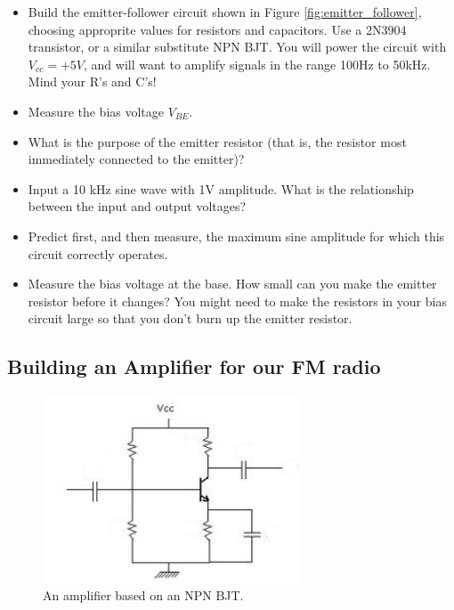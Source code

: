 \documentclass[11pt]{article}
\begin{document}
\begin{itemize}
\item Build the emitter-follower circuit shown in Figure \ref{fig:emitter_follower}, choosing approprite
values for resistors and capacitors.  Use a 2N3904 transistor, or a similar substitute NPN BJT.  You will
power the circuit with $V_{cc}=+5V$, and will want to amplify signals in the range 100Hz to 50kHz.  Mind
your R's and C's!
\item Measure the bias voltage $V_{BE}$.
\item What is the purpose of the emitter resistor (that is, the resistor most immediately connected to the
emitter)?
\item Input a 10 kHz sine wave with 1V amplitude.  What is the relationship between the input and output voltages?
\item Predict first, and then measure, the maximum sine amplitude for which this circuit correctly operates.
\item Measure the bias voltage at the base.  How small can you make the emitter resistor before it changes?  You
might need to make the resistors in your bias circuit large so that you don't burn up the emitter resistor.
\end{itemize}

\subsection{Building an Amplifier for our FM radio}

\begin{figure}[h!]\centering
\includegraphics[width=3in]{plots/bjt_amplifier_lab2.png}
\caption{An amplifier based on an NPN BJT.}
\label{fig:amplifier}
\end{figure}
\end{document}
